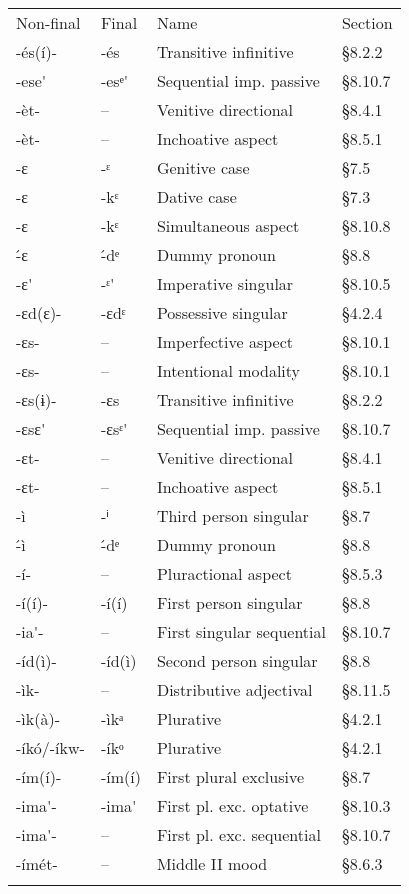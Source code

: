 \begin{table}
\begin{tabularx}{\textwidth}{XXXX}
Non-final & Final & Name & Section\\
{}-és(í)- & {}-és & Transitive infinitive & §8.2.2\\
{}-ese\'{ } & {}-esᵉ\'{ } & Sequential imp. passive & §8.10.7\\
{}-èt- & – & Venitive directional & §8.4.1\\
{}-èt- & – & Inchoative aspect & §8.5.1\\
{}-ɛ & {}-ᵋ & Genitive case & §7.5\\
{}-ɛ & {}-kᵋ & Dative case & §7.3\\
{}-ɛ & {}-kᵋ & Simultaneous aspect & §8.10.8\\
{}\'{-}ɛ & {}\'{-}dᵉ & Dummy pronoun & §8.8\\
{}-ɛ\'{ } & {}-ᵋ\'{ } & Imperative singular & §8.10.5\\
{}-ɛd(ɛ)- & {}-ɛdᵋ & Possessive singular & §4.2.4\\
{}-ɛs- & – & Imperfective aspect & §8.10.1\\
{}-ɛs- & – & Intentional modality & §8.10.1\\
{}-ɛs(ɨ)- & {}-ɛs & Transitive infinitive & §8.2.2\\
{}-ɛsɛ\'{ } & {}-ɛsᵋ\'{ } & Sequential imp. passive & §8.10.7\\
{}-ɛt- & – & Venitive directional & §8.4.1\\
{}-ɛt- & – & Inchoative aspect & §8.5.1\\
{}-ì & {}-ⁱ & Third person singular & §8.7\\
{}\'{-}ì & {}\'{-}dᵉ & Dummy pronoun & §8.8\\
{}-í- & – & Pluractional aspect & §8.5.3\\
{}-í(í)- & {}-í(í) & First person singular & §8.8\\
{}-ia\'{ }- & – & First singular sequential & §8.10.7\\
{}-íd(ì)- & {}-íd(ì) & Second person singular & §8.8\\
{}-ìk- & – & Distributive adjectival & §8.11.5\\
{}-ìk(à)- & {}-ìkᵃ & Plurative & §4.2.1\\
{}-íkó/-íkw- & {}-íkᵒ & Plurative & §4.2.1\\
{}-ím(í)- & {}-ím(í) & First plural exclusive & §8.7\\
{}-ima\'{ }- & {}-ima\'{ } & First pl. exc. optative & §8.10.3\\
{}-ima\'{ }- & – & First pl. exc. sequential & §8.10.7\\
{}-ímét- & – & Middle II mood & §8.6.3\\
\lspbottomrule
\end{tabularx}


\end{table}
